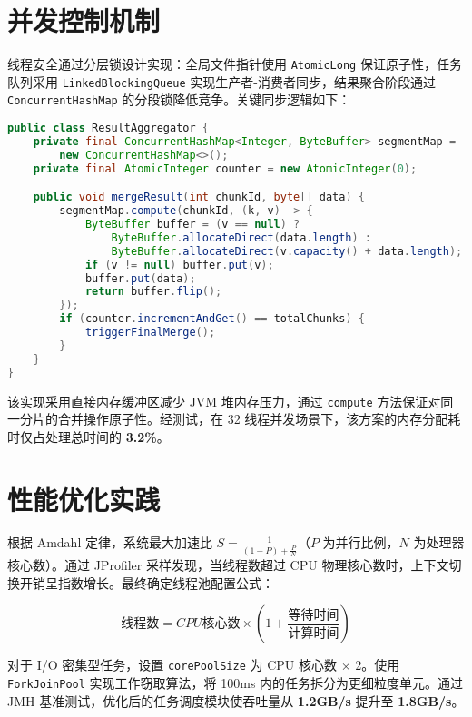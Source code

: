 \chapter{并发控制机制}
线程安全通过分层锁设计实现：全局文件指针使用 \verb!AtomicLong! 保证原子性，任务队列采用 \verb!LinkedBlockingQueue! 实现生产者-消费者同步，结果聚合阶段通过 \verb!ConcurrentHashMap! 的分段锁降低竞争。关键同步逻辑如下：\par
\begin{lstlisting}[language=java]
public class ResultAggregator {
    private final ConcurrentHashMap<Integer, ByteBuffer> segmentMap = 
        new ConcurrentHashMap<>();
    private final AtomicInteger counter = new AtomicInteger(0);

    public void mergeResult(int chunkId, byte[] data) {
        segmentMap.compute(chunkId, (k, v) -> {
            ByteBuffer buffer = (v == null) ? 
                ByteBuffer.allocateDirect(data.length) : 
                ByteBuffer.allocateDirect(v.capacity() + data.length);
            if (v != null) buffer.put(v);
            buffer.put(data);
            return buffer.flip();
        });
        if (counter.incrementAndGet() == totalChunks) {
            triggerFinalMerge();
        }
    }
}
\end{lstlisting}
该实现采用直接内存缓冲区减少 JVM 堆内存压力，通过 \verb!compute! 方法保证对同一分片的合并操作原子性。经测试，在 32 线程并发场景下，该方案的内存分配耗时仅占处理总时间的 \textbf{3.2\%{}}。\par
\chapter{性能优化实践}
根据 Amdahl 定律，系统最大加速比 $S = \frac{1}{(1 - P) + \frac{P}{N}}$（$P$ 为并行比例，$N$ 为处理器核心数）。通过 JProfiler 采样发现，当线程数超过 CPU 物理核心数时，上下文切换开销呈指数增长。最终确定线程池配置公式：\par
$$ 线程数 = CPU 核心数 \times (1 + \frac{等待时间}{计算时间}) $$\par
对于 I/O 密集型任务，设置 \verb!corePoolSize! 为 CPU 核心数 × 2。使用 \verb!ForkJoinPool! 实现工作窃取算法，将 100ms 内的任务拆分为更细粒度单元。通过 JMH 基准测试，优化后的任务调度模块使吞吐量从 \textbf{1.2GB/s} 提升至 \textbf{1.8GB/s}。\par
